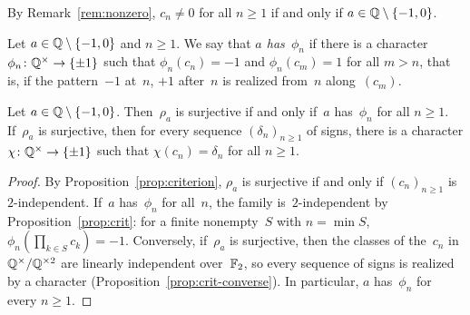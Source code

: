By Remark~\ref{rem:nonzero}, $c_n \ne 0$ for all $n \ge 1$ if and only if
$a \in \mathbb{Q} \setminus \{-1, 0\}$.

\begin{definition}[$\phi_n$]
  \label{def:phin}
  \leanok
  Let $a \in \mathbb{Q} \setminus \{-1, 0\}$ and $n \ge 1$. We say that \emph{$a$ has~$\phi_n$} if there
  is a character $\phi_n \colon \mathbb{Q}^\times \to \{\pm 1\}$ such that $\phi_n(c_n) = -1$ and
  $\phi_n(c_m) = 1$ for all $m > n$, that is, if the pattern~$-1$ at~$n$, $+1$ after~$n$ is
  realized from~$n$ along~$(c_m)$.
\end{definition}

\begin{proposition}
  \label{prop:tfae}
  \leanok
  Let $a \in \mathbb{Q} \setminus \{-1, 0\}$. Then~$\rho_a$ is surjective if and only if~$a$
  has~$\phi_n$ for all $n \ge 1$. If~$\rho_a$ is surjective, then for every sequence
  $(\delta_n)_{n \ge 1}$ of signs, there is a character $\chi \colon \mathbb{Q}^\times \to \{\pm 1\}$
  such that $\chi(c_n) = \delta_n$ for all $n \ge 1$.
\end{proposition}
\begin{proof}
  \leanok
  By Proposition~\ref{prop:criterion}, $\rho_a$ is surjective if and only if $(c_n)_{n \ge 1}$
  is~$2$-independent. If~$a$ has~$\phi_n$ for all~$n$, the family is~$2$-independent by
  Proposition~\ref{prop:crit}: for a finite nonempty~$S$ with $n = \min S$,
  $\phi_n(\prod_{k \in S} c_k) = -1$. Conversely, if~$\rho_a$ is surjective, then the classes of
  the~$c_n$ in $\mathbb{Q}^\times/\mathbb{Q}^{\times 2}$ are linearly independent over~$\mathbb{F}_2$, so every
  sequence of signs is realized by a character (Proposition~\ref{prop:crit-converse}). In
  particular, $a$ has~$\phi_n$ for every $n \ge 1$.
\end{proof}

